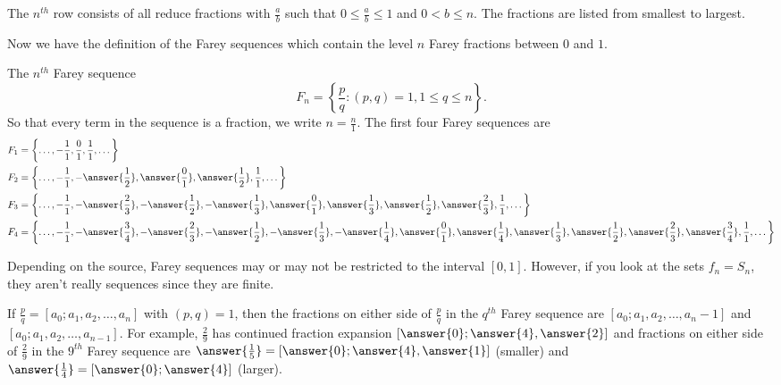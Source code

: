 \documentclass{ximera}
\begin{document}
\begin{corollary}
 The $n^{th}$ row consists of all reduce fractions with $\frac{a}{b}$ such that $0\leq \frac{a}{b}\leq 1$ and $0<b\leq n$. The fractions are listed from smallest to largest.
\end{corollary}

Now we have the definition of the Farey sequences which contain the level $n$ Farey fractions between $0$ and $1$.
\begin{definition}
 The $n^{th}$ Farey sequence 
 \[F_n=\left\{\frac{p}{q}:(p,q)=1, 1\leq q  \leq n\right\}.\] So that every term in the sequence is a fraction, we write $n=\frac{n}{1}$.  The first four Farey sequences are 
\begin{align*}
 F_1&=\left\{\dots,-\frac{1}{1},\frac{0}{1},\frac{1}{1},\dots\right\}\\
 F_2&=\left\{\dots,-\frac{1}{1},-\answer{\frac{1}{2}},\answer{\frac{0}{1}},\answer{\frac{1}{2}},\frac{1}{1},\dots\right\}\\
 F_3&=\left\{\dots,-\frac{1}{1},-\answer{\frac{2}{3}},-\answer{\frac{1}{2}},-\answer{\frac{1}{3}},\answer{\frac{0}{1}},\answer{\frac{1}{3}},\answer{\frac{1}{2}},\answer{\frac{2}{3}},\frac{1}{1},\dots\right\}\\
 F_4&=\left\{\dots,-\frac{1}{1},-\answer{\frac{3}{4}},-\answer{\frac{2}{3}},-\answer{\frac{1}{2}},-\answer{\frac{1}{3}},-\answer{\frac{1}{4}},\answer{\frac{0}{1}},\answer{\frac{1}{4}},\answer{\frac{1}{3}},\answer{\frac{1}{2}},\answer{\frac{2}{3}},\answer{\frac{3}{4}},\frac{1}{1},\dots\right\}\\
\end{align*}
\end{definition}
Depending on the source, Farey sequences may or may not be restricted to the interval $[0,1]$. However, if you look at the sets $f_n=S_n$, they aren't really sequences since they are finite.

\begin{remark}
If $\frac{p}{q}=[a_0;a_1,a_2,\dots,a_n]$ with $(p,q)=1$, then the fractions on either side of $\frac{p}{q}$ in the $q^{th}$ Farey sequence are $[a_0;a_1,a_2,\dots,a_n-1]$ and $[a_0;a_1,a_2,\dots,a_{n-1}]$. For example, $\frac{2}{9}$ has continued fraction expansion $[\answer{0};\answer{4},\answer{2}]$ and fractions on either side of $\frac{2}{9}$ in the $9^{th}$ Farey sequence are $\answer{\frac{1}{5}}=[\answer{0};\answer{4},\answer{1}]$ (smaller) and $\answer{\frac{1}{4}}=[\answer{0};\answer{4}]$ (larger).
\end{remark}
\end{document}
